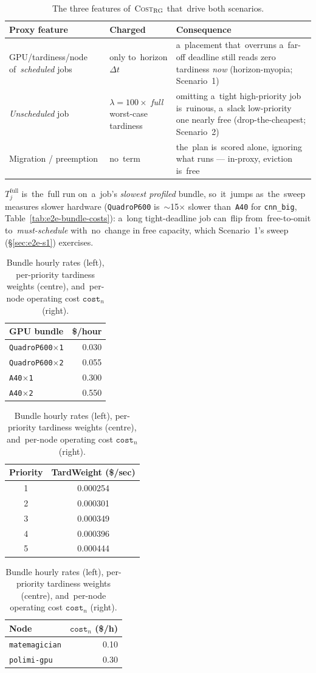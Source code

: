 \begin{table}[H]\centering\small
\begin{tabularx}{\textwidth}{@{}l l X@{}}\toprule
Proxy feature & Charged & Consequence \\\midrule
GPU/tardiness/node of~\emph{scheduled} jobs & only to~horizon $\Delta t$ & a~placement that~overruns a~far-off deadline still reads zero tardiness \emph{now} (horizon-myopia; Scenario~1) \\
\emph{Unscheduled} job & $\lambda{=}100\times$ \emph{full} worst-case tardiness & omitting a~tight high-priority job is~ruinous, a~slack low-priority one nearly free (drop-the-cheapest; Scenario~2) \\
Migration / preemption & no~term & the~plan is~scored alone, ignoring what runs --- in-proxy, eviction is~free \\\bottomrule
\end{tabularx}
\caption{The three features of~\textsc{Cost}$_\textsc{RG}$ that~drive both
scenarios.}\label{tab:e2e-proxy-features}
\end{table}

$T^{\mathrm{full}}_j$ is~the~full run on~a~job's \emph{slowest profiled}
bundle, so~it~jumps as~the~sweep measures slower hardware
(\texttt{QuadroP600} is~$\sim$15$\times$ slower than~\texttt{A40} for
\texttt{cnn\_big}, Table~\ref{tab:e2e-bundle-costs}): a~long tight-deadline
job can~flip from~free-to-omit to~\emph{must-schedule} with~no~change in
free capacity, which Scenario~1's sweep (\S\ref{sec:e2e-s1}) exercises.

\begin{table}[H]\centering\small
\begin{tabular}{lr}\toprule
GPU bundle & \$/hour \\\midrule
\texttt{QuadroP600$\times$1} & 0.030 \\
\texttt{QuadroP600$\times$2} & 0.055 \\
\texttt{A40$\times$1}        & 0.300 \\
\texttt{A40$\times$2}        & 0.550 \\\bottomrule
\end{tabular}
\quad
\begin{tabular}{cc}\toprule
Priority & TardWeight (\$/sec) \\\midrule
1 & 0.000254 \\
2 & 0.000301 \\
3 & 0.000349 \\
4 & 0.000396 \\
5 & 0.000444 \\\bottomrule
\end{tabular}
\quad
\begin{tabular}{lr}\toprule
Node & $\texttt{cost}_n$ (\$/h) \\\midrule
\texttt{matemagician} & 0.10 \\
\texttt{polimi-gpu}   & 0.30 \\\bottomrule
\end{tabular}
\caption{Bundle hourly rates (left), per-priority tardiness weights
(centre), and~per-node operating cost $\texttt{cost}_n$
(right).}\label{tab:e2e-rates}
\end{table}

